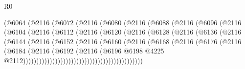 \begin{lexlean}{R0}
\begin{coremodule}
                        (@6064
                          (@2116
                            (@6072
                              (@2116
                                (@6080
                                  (@2116
                                    (@6088
                                      (@2116
                                        (@6096
                                          (@2116
                                            (@6104
                                              (@2116
                                                (@6112
                                                  (@2116
                                                    (@6120
                                                      (@2116
                                                        (@6128
                                                          (@2116
                                                            (@6136
                                                              (@2116
                                                                (@6144
                                                                  (@2116
                                                                    (@6152
                                                                      (@2116
                                                                        (@6160
                                                                          (@2116
                                                                            (@6168
                                                                              (@2116
                                                                                (@6176
                                                                                  (@2116
                                                                                    (@6184
                                                                                      (@2116
                                                                                        (@6192
                                                                                          (@2116
                                                                                            (@6196
                                                                                              @6198
                                                                                              @4225
                                                                                              @2112)))))))))))))))))))))))))))))))))))))))))))))

\end{coremodule}
\end{lexlean}

